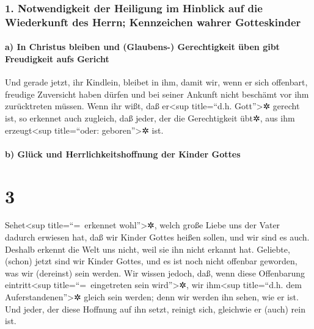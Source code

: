 \hypertarget{notwendigkeit-der-heiligung-im-hinblick-auf-die-wiederkunft-des-herrn-kennzeichen-wahrer-gotteskinder}{%
\subsubsection{1. Notwendigkeit der Heiligung im Hinblick auf die
Wiederkunft des Herrn; Kennzeichen wahrer
Gotteskinder}\label{notwendigkeit-der-heiligung-im-hinblick-auf-die-wiederkunft-des-herrn-kennzeichen-wahrer-gotteskinder}}

\hypertarget{a-in-christus-bleiben-und-glaubens--gerechtigkeit-uxfcben-gibt-freudigkeit-aufs-gericht}{%
\paragraph{a) In Christus bleiben und (Glaubens-) Gerechtigkeit üben
gibt Freudigkeit aufs
Gericht}\label{a-in-christus-bleiben-und-glaubens--gerechtigkeit-uxfcben-gibt-freudigkeit-aufs-gericht}}

 Und gerade jetzt, ihr Kindlein, bleibet in ihm, damit
wir, wenn er sich offenbart, freudige Zuversicht haben dürfen und bei
seiner Ankunft nicht beschämt vor ihm zurücktreten müssen.
 Wenn ihr wißt, daß er\textless sup title=``d.h.
Gott''\textgreater✲ gerecht ist, so erkennet auch zugleich, daß jeder,
der die Gerechtigkeit übt✲, aus ihm erzeugt\textless sup title=``oder:
geboren''\textgreater✲ ist.

\hypertarget{b-gluxfcck-und-herrlichkeitshoffnung-der-kinder-gottes}{%
\paragraph{b) Glück und Herrlichkeitshoffnung der Kinder
Gottes}\label{b-gluxfcck-und-herrlichkeitshoffnung-der-kinder-gottes}}

\hypertarget{section-2}{%
\section{3}\label{section-2}}

 Sehet\textless sup title=``=~erkennet
wohl''\textgreater✲, welch große Liebe uns der Vater dadurch erwiesen
hat, daß wir Kinder Gottes heißen sollen, und wir sind es auch. Deshalb
erkennt die Welt uns nicht, weil sie ihn nicht erkannt hat.
 Geliebte, (schon) jetzt sind wir Kinder Gottes, und es
ist noch nicht offenbar geworden, was wir (dereinst) sein werden. Wir
wissen jedoch, daß, wenn diese Offenbarung eintritt\textless sup
title=``=~eingetreten sein wird''\textgreater✲, wir ihm\textless sup
title=``d.h. dem Auferstandenen''\textgreater✲ gleich sein werden; denn
wir werden ihn sehen, wie er ist.  Und jeder, der diese
Hoffnung auf ihn setzt, reinigt sich, gleichwie er (auch) rein ist.

